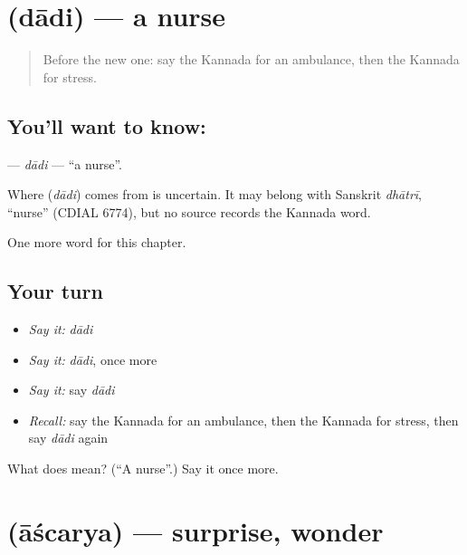 \section[\texorpdfstring{\kn{ದಾದಿ} (dādi)}{ದಾದಿ (dādi)}]{ (dādi) — a nurse}

\label{lesson:KA-C282-dadi}



\begin{quote}
Before the new one: say the Kannada for an ambulance, then the Kannada for stress.
\end{quote}

\subsection*{You'll want to know: }
\textbf{} — \emph{dādi} — \textquotedblleft{}a nurse\textquotedblright{}.

\begin{cousinweb}
Where \textbf{} (\emph{dādi}) comes from is uncertain. It may belong with Sanskrit \emph{dhātrī}, \textquotedblleft{}nurse\textquotedblright{} (CDIAL 6774), but no source records the Kannada word.
\end{cousinweb}

\begin{grammarlens}[title={What you've built}]
One more word for this chapter.
\end{grammarlens}

\subsection*{Your turn}
\begin{itemize}
\raggedright
  \item \emph{Say it:} \emph{dādi}
  \item \emph{Say it:} \emph{dādi}, once more
  \item \emph{Say it:} say \emph{dādi}
  \item \emph{Recall:} say the Kannada for an ambulance, then the Kannada for stress, then say \emph{dādi} again
\end{itemize}

\begin{tcolorbox}[breakable,colback=teal!4,colframe=teal!35!black,title={Before you move on}]
What does  mean? (\textquotedblleft{}A nurse\textquotedblright{}.) Say it once more.
\end{tcolorbox}
\section[\texorpdfstring{\kn{ಆಶ್ಚರ್ಯ} (āścarya)}{ಆಶ್ಚರ್ಯ (āścarya)}]{ (āścarya) — surprise, wonder}

